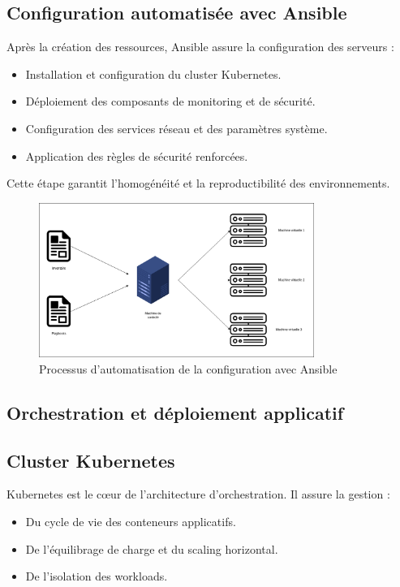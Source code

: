 \subsection*{Configuration automatisée avec Ansible}

Après la création des ressources, Ansible assure la configuration des serveurs :
\begin{itemize}
	\item Installation et configuration du cluster Kubernetes.
	\item Déploiement des composants de monitoring et de sécurité.
	\item Configuration des services réseau et des paramètres système.
	\item Application des règles de sécurité renforcées.
\end{itemize}

Cette étape garantit l’homogénéité et la reproductibilité des environnements.

\begin{figure}[H]
	\centering
	\includegraphics[width=0.8\textwidth]{figures/ansible-configuration.png}
	\caption{Processus d'automatisation de la configuration avec Ansible}
\end{figure}

\subsection{Orchestration et déploiement applicatif}

\subsection*{Cluster Kubernetes}

Kubernetes est le cœur de l’architecture d’orchestration. Il assure la gestion :
\begin{itemize}
	\item Du cycle de vie des conteneurs applicatifs.
	\item De l’équilibrage de charge et du scaling horizontal.
	\item De l’isolation des workloads.
\end{itemize}

